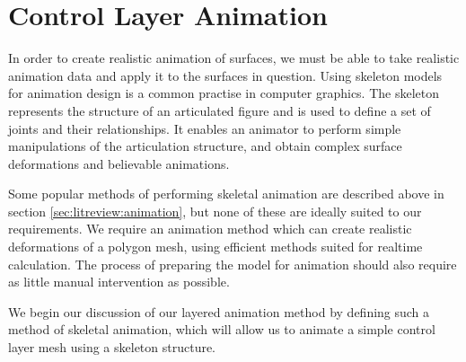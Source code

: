 \chapter{\label{sec:skeletalanim}Control Layer Animation}

In order to create realistic animation of surfaces, we must be able to take realistic animation data and apply it to the surfaces in question. Using skeleton models for animation design is a common practise in computer graphics. The skeleton represents the structure of an articulated figure and is used to define a set of joints and their relationships. It enables an animator to perform simple manipulations of the articulation structure, and obtain complex surface deformations and believable animations.

Some popular methods of performing skeletal animation are described above in section \ref{sec:litreview:animation}, but none of these are ideally suited to our requirements. We require an animation method which can create realistic deformations of a polygon mesh, using efficient methods suited for realtime calculation. The process of preparing the model for animation should also require as little manual intervention as possible. 

We begin our discussion of our layered animation method by defining such a method of skeletal animation, which will allow us to animate a simple control layer mesh using a skeleton structure.

